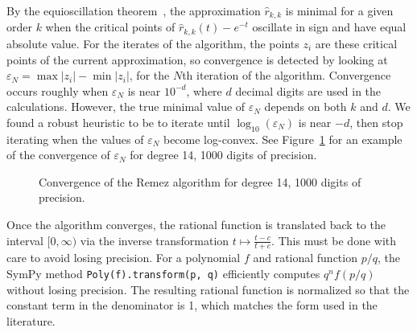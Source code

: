 By the equioscillation theorem~\cite{ationneeded}, the approximation
$\hat{r}_{k, k}$ is minimal for a given order $k$ when the critical points of
$\hat{r}_{k, k}(t) - e^{-t}$ oscillate in sign and have equal absolute value.
For the iterates of the algorithm, the points $z_i$ are these critical points
of the current approximation, so convergence is detected by looking at
$\varepsilon_N = \max{|z_i|} - \min{|z_i|}$, for the $N$th iteration of the
algorithm. Convergence occurs roughly when $\varepsilon_N$ is near $10^{-d}$,
where $d$ decimal digits are used in the calculations. However, the true
minimal value of $\varepsilon_N$ depends on both $k$ and $d$. We found a
robust heuristic to be to iterate until $\log_{10}{(\varepsilon_N)}$ is near
$-d$, then stop iterating when the values of $\varepsilon_N$ become
log-convex. See Figure~\ref{fig:convergence-14-1000} for an example of the
convergence of $\varepsilon_N$ for degree 14, 1000 digits of precision.

\begin{figure}[!ht]
\centering
\resizebox{0.9\textwidth}{!}{}
\caption{Convergence of the Remez algorithm for degree 14, 1000 digits of
  precision.}
\label{fig:convergence-14-1000}
\end{figure}

Once the algorithm converges, the rational function is translated back to the
interval $[0, \infty)$ via the inverse transformation
$t\mapsto \frac{t - c}{t + c}$. This must be done with care to avoid losing
precision. For a polynomial $f$ and rational function $p/q$, the SymPy method
\texttt{Poly(f).\allowbreak{}transform(p, q)} efficiently computes
$q^nf\left(p/q\right)$ without losing precision. The resulting rational
function is normalized so that the constant term in the denominator is 1,
which matches the form used in the literature.~\cite{ationneeded}

